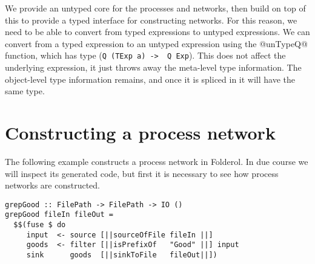 We provide an untyped core for the processes and networks, then build on top of this to provide a typed interface for constructing networks.
For this reason, we need to be able to convert from typed expressions to untyped expressions.
We can convert from a typed expression to an untyped expression using the @unTypeQ@ function, which has type (\lstinline/Q (TExp a) ->  Q Exp/).
This does not affect the underlying expression, it just throws away the meta-level type information.
The object-level type information remains, and once it is spliced in it will have the same type.

 


\section{Constructing a process network}

The following example constructs a process network in Folderol.
In due course we will inspect its generated code, but first it is necessary to see how process networks are constructed.

\begin{lstlisting}
grepGood :: FilePath -> FilePath -> IO ()
grepGood fileIn fileOut =
  $$(fuse $ do
     input  <- source [||sourceOfFile fileIn ||]
     goods  <- filter [||isPrefixOf   "Good" ||] input
     sink      goods  [||sinkToFile   fileOut||])
\end{lstlisting}


